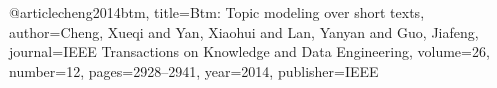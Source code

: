 @article{cheng2014btm,
  title={Btm: Topic modeling over short texts},
  author={Cheng, Xueqi and Yan, Xiaohui and Lan, Yanyan and Guo, Jiafeng},
  journal={IEEE Transactions on Knowledge and Data Engineering},
  volume={26},
  number={12},
  pages={2928--2941},
  year={2014},
  publisher={IEEE}
}